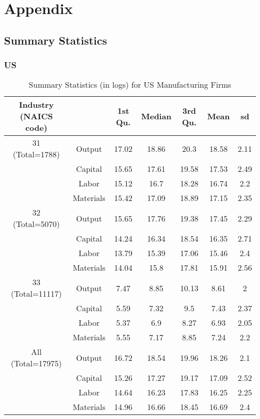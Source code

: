 \documentclass[11pt]{article}
\begin{document}



\pagebreak
\newpage

\section*{Appendix} \label{Appendix}
\subsection{Summary Statistics}

\subsubsection*{US}

\begin{table}[H]
\centering
\caption{Summary Statistics (in logs) for US Manufacturing Firms}
\begin{tabular}{ccccccc}
  \hline\hline Industry (NAICS code) &   & 1st Qu. & Median & 3rd Qu. & Mean & sd \\ 
  \hline
31 (Total=1788) & Output & 17.02 & 18.86 & 20.3 & 18.58 & 2.11 \\ 
   & Capital & 15.65 & 17.61 & 19.58 & 17.53 & 2.49 \\ 
   & Labor & 15.12 & 16.7 & 18.28 & 16.74 & 2.2 \\ 
   & Materials & 15.42 & 17.09 & 18.89 & 17.15 & 2.35 \\ 
  32 (Total=5070) & Output & 15.65 & 17.76 & 19.38 & 17.45 & 2.29 \\ 
   & Capital & 14.24 & 16.34 & 18.54 & 16.35 & 2.71 \\ 
   & Labor & 13.79 & 15.39 & 17.06 & 15.46 & 2.4 \\ 
   & Materials & 14.04 & 15.8 & 17.81 & 15.91 & 2.56 \\ 
  33 (Total=11117) & Output & 7.47 & 8.85 & 10.13 & 8.61 & 2 \\ 
   & Capital & 5.59 & 7.32 & 9.5 & 7.43 & 2.37 \\ 
   & Labor & 5.37 & 6.9 & 8.27 & 6.93 & 2.05 \\ 
   & Materials & 5.55 & 7.17 & 8.85 & 7.24 & 2.2 \\ 
  All (Total=17975) & Output & 16.72 & 18.54 & 19.96 & 18.26 & 2.1 \\ 
   & Capital & 15.26 & 17.27 & 19.17 & 17.09 & 2.52 \\ 
   & Labor & 14.64 & 16.23 & 17.83 & 16.25 & 2.25 \\ 
   & Materials & 14.96 & 16.66 & 18.45 & 16.69 & 2.4 \\ 
   \hline
\end{tabular}
\label{USsum}
\end{table}
\end{document}
